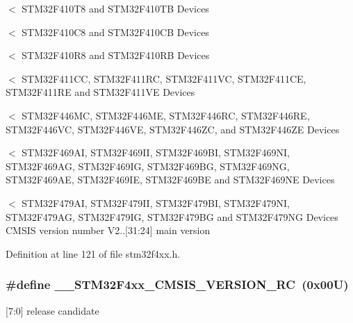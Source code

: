 $<$ S\+T\+M32\+F410\+T8 and S\+T\+M32\+F410\+TB Devices

$<$ S\+T\+M32\+F410\+C8 and S\+T\+M32\+F410\+CB Devices

$<$ S\+T\+M32\+F410\+R8 and S\+T\+M32\+F410\+RB Devices

$<$ S\+T\+M32\+F411\+CC, S\+T\+M32\+F411\+RC, S\+T\+M32\+F411\+VC, S\+T\+M32\+F411\+CE, S\+T\+M32\+F411\+RE and S\+T\+M32\+F411\+VE Devices

$<$ S\+T\+M32\+F446\+MC, S\+T\+M32\+F446\+ME, S\+T\+M32\+F446\+RC, S\+T\+M32\+F446\+RE, S\+T\+M32\+F446\+VC, S\+T\+M32\+F446\+VE, S\+T\+M32\+F446\+ZC, and S\+T\+M32\+F446\+ZE Devices

$<$ S\+T\+M32\+F469\+AI, S\+T\+M32\+F469\+II, S\+T\+M32\+F469\+BI, S\+T\+M32\+F469\+NI, S\+T\+M32\+F469\+AG, S\+T\+M32\+F469\+IG, S\+T\+M32\+F469\+BG, S\+T\+M32\+F469\+NG, S\+T\+M32\+F469\+AE, S\+T\+M32\+F469\+IE, S\+T\+M32\+F469\+BE and S\+T\+M32\+F469\+NE Devices

$<$ S\+T\+M32\+F479\+AI, S\+T\+M32\+F479\+II, S\+T\+M32\+F479\+BI, S\+T\+M32\+F479\+NI, S\+T\+M32\+F479\+AG, S\+T\+M32\+F479\+IG, S\+T\+M32\+F479\+BG and S\+T\+M32\+F479\+NG Devices C\+M\+S\+IS version number V2..\mbox{[}31\+:24\mbox{]} main version 

Definition at line 121 of file stm32f4xx.\+h.

\subsubsection[{\texorpdfstring{\+\_\+\+\_\+\+S\+T\+M32\+F4xx\+\_\+\+C\+M\+S\+I\+S\+\_\+\+V\+E\+R\+S\+I\+O\+N\+\_\+\+RC}{__STM32F4xx_CMSIS_VERSION_RC}}]{\setlength{\rightskip}{0pt plus 5cm}\#define \+\_\+\+\_\+\+S\+T\+M32\+F4xx\+\_\+\+C\+M\+S\+I\+S\+\_\+\+V\+E\+R\+S\+I\+O\+N\+\_\+\+RC~(0x00\+U)}\hypertarget{group___library__configuration__section_gafbd304f122892833ce0d4daa3dc4ff13}{}\label{group___library__configuration__section_gafbd304f122892833ce0d4daa3dc4ff13}
\mbox{[}7\+:0\mbox{]} release candidate 

